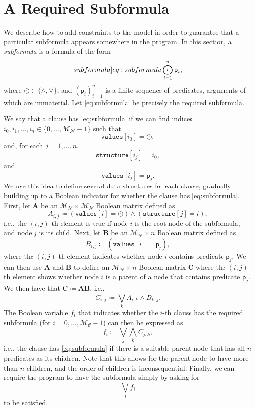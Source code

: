 \documentclass{article}
\newcommand{\maxNumNodes}{\mathcal{M}_{\mathcal{N}}}
\newcommand{\maxNumClauses}{\mathcal{M}_{\mathcal{C}}}
\begin{document}
\section{A Required Subformula}

We describe how to add constraints to the model in order to guarantee that a
particular subformula appears somewhere in the program. In this section, a
\emph{subformula} is a formula of the form
\begin{equation} \label[subformula]{eq:subformula}
  \bigodot_{i=1}^n \mathsf{p}_i,
\end{equation}
where $\odot \in \{ \land, \lor \}$, and $(\mathsf{p}_i)_{i=1}^n$ is a finite
sequence of predicates, arguments of which are immaterial. Let
\cref{eq:subformula} be precisely the required subformula.

We say that a clause has \cref{eq:subformula} if we can find indices
$i_0, i_1, \dots, i_n \in \{0, \dots, \maxNumNodes{} - 1 \}$ such that
\[
  \mathtt{values}[i_0] = \odot,
\]
and, for each $j = 1, \dots, n$,
\[
  \mathtt{structure}[i_j] = i_0,
\]
and
\[
  \mathtt{values}[i_j] = \mathsf{p}_j.
\]
We use this idea to define several data structures for each clause, gradually
building up to a Boolean indicator for whether the clause has
\cref{eq:subformula}. First, let $\mathbf{A}$ be an $\maxNumNodes{} \times
\maxNumNodes{}$ Boolean matrix defined as
\[
  A_{i,j} \coloneqq (\mathtt{values}[i] = \odot) \land (\mathtt{structure}[j] = i),
\]
i.e., the $(i,j)$-th element is true if node $i$ is the root node of the
subformula, and node $j$ is its child. Next, let $\mathbf{B}$ be an
$\maxNumNodes{} \times n$ Boolean matrix defined as
\[
  B_{i,j} \coloneqq (\mathtt{values}[i] = \mathsf{p}_j),
\]
where the $(i,j)$-th element indicates whether node $i$ contains predicate
$\mathsf{p}_j$. We can then use $\mathbf{A}$ and $\mathbf{B}$ to define an
$\maxNumNodes{} \times n$ Boolean matrix $\mathbf{C}$ where the $(i,j)$-th
element shows whether node $i$ is a parent of a node that contains predicate
$\mathsf{p}_j$. We then have that $\mathbf{C} \coloneqq \mathbf{A} \mathbf{B}$,
i.e.,
\[
  C_{i,j} \coloneqq \bigvee_k A_{i,k} \land B_{k,j}.
\]
The Boolean variable $f_i$ that indicates whether the $i$-th clause has the
required subformula (for $i = 0, \dots, \maxNumClauses{} - 1$) can then be
expressed as
\[
  f_i \coloneqq \bigvee_j \bigwedge_k C_{j,k},
\]
i.e., the clause has \cref{eq:subformula} if there is a suitable parent node
that has all $n$ predicates as its children. Note that this allows for the
parent node to have more than $n$ children, and the order of children is
inconsequential. Finally, we can require the program to have the subformula
simply by asking for
\[
  \bigvee_i f_i
\]
to be satisfied.
\end{document}
